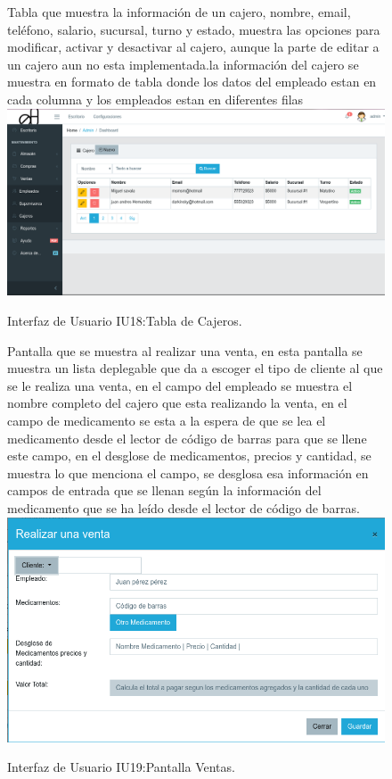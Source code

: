 \begin{figure}[htbp!]
	\begin{center}
	Tabla que muestra la información de un cajero, nombre, email, teléfono, salario, sucursal, turno y estado, muestra las opciones para modificar, activar y desactivar al cajero, aunque la parte de editar a un cajero aun no esta implementada.la información del cajero se muestra en formato de tabla donde los datos del empleado estan en cada columna y los empleados estan en diferentes filas
\includegraphics[width=\textwidth]{Pantallas/tablaCajeros}
		\caption{Interfaz de Usuario IU18:Tabla de Cajeros.}
	\end{center}
\end{figure}



\begin{figure}[htbp!]
	\begin{center}
	Pantalla que se muestra al realizar una venta, en esta pantalla se muestra un lista deplegable que da a escoger el tipo de cliente al que se le realiza una venta, en el campo del empleado se muestra el nombre completo del cajero que esta realizando la venta, en el campo de medicamento se esta a la espera de que se lea el medicamento desde el lector de código de barras para que se llene este campo, 
	en el desglose de medicamentos, precios y cantidad, se muestra lo que menciona el campo, se desglosa  esa información en campos de entrada que se llenan según la información del medicamento que se ha leído desde el lector de código de barras.
\includegraphics[width=\textwidth]{Pantallas/pantallaVentas}
		\caption{Interfaz de Usuario IU19:Pantalla Ventas.}
	\end{center}
\end{figure}

